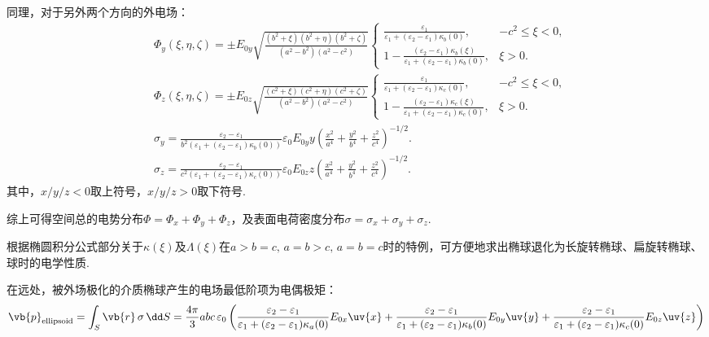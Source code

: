 同理，对于另外两个方向的外电场：
\begin{align*}
	&\Phi_y(\xi, \eta, \zeta) = \pm E_{0y} \sqrt{\frac{(b^2 + \xi)(b^2 + \eta)(b^2 + \zeta)}{(a^2 - b^2)(a^2 - c^2)}}\begin{cases}
		\displaystyle\frac{\varepsilon_1 }{\varepsilon_1 + (\varepsilon_2 - \varepsilon_1)\kappa_b(0)},                                    & -c^2 \leq \xi < 0, \\[8pt]
		\displaystyle 1 - \frac{(\varepsilon_2 - \varepsilon_1)\kappa_b(\xi)}{\varepsilon_1 + (\varepsilon_2 - \varepsilon_1)\kappa_b(0)}, & \xi > 0.
	\end{cases}\\
	&\Phi_z(\xi, \eta, \zeta) = \pm E_{0z} \sqrt{\frac{(c^2 + \xi)(c^2 + \eta)(c^2 + \zeta)}{(a^2 - b^2)(a^2 - c^2)}}\begin{cases}
		\displaystyle\frac{\varepsilon_1 }{\varepsilon_1 + (\varepsilon_2 - \varepsilon_1)\kappa_c(0)},                                    & -c^2 \leq \xi < 0, \\[8pt]
		\displaystyle 1 - \frac{(\varepsilon_2 - \varepsilon_1)\kappa_c(\xi)}{\varepsilon_1 + (\varepsilon_2 - \varepsilon_1)\kappa_c(0)}, & \xi > 0.
	\end{cases}\\
	&\sigma_y = \frac{\varepsilon_2 - \varepsilon_1}{ b^2  \left( \varepsilon_1 + (\varepsilon_2 - \varepsilon_1) \kappa_b(0) \right)} \varepsilon_0 E_{0y} y \left( \frac{x^2}{a^4} + \frac{y^2}{b^4} + \frac{z^2}{c^4} \right)^{-1/2}.\\
	&\sigma_z = \frac{\varepsilon_2 - \varepsilon_1}{c^2 \left( \varepsilon_1 + (\varepsilon_2 - \varepsilon_1) \kappa_c(0) \right)} \varepsilon_0 E_{0z} z \left( \frac{x^2}{a^4} + \frac{y^2}{b^4} + \frac{z^2}{c^4} \right)^{-1/2}.
\end{align*}
其中，\(x/y/z<0\)取上符号，\(x/y/z>0\)取下符号.

综上可得空间总的电势分布\(\Phi=\Phi_x+\Phi_y+\Phi_z\)，及表面电荷密度分布\(\sigma=\sigma_x+\sigma_y+\sigma_z\).

根据椭圆积分公式部分关于\(\kappa(\xi)\)及\(\Lambda(\xi)\)在\(a>b=c,\,a=b>c,\,a=b=c\)时的特例，可方便地求出椭球退化为长旋转椭球、扁旋转椭球、球时的电学性质.

在远处，被外场极化的介质椭球产生的电场最低阶项为电偶极矩：
\begin{align*}
	\vb{p}_{\text{ellipsoid}} = \int_S \vb{r}\,\sigma \, \dd S = \frac{4\pi}{3} a b c\,\varepsilon_0 \left(
	\frac{\varepsilon_2 - \varepsilon_1}{\varepsilon_1 + (\varepsilon_2 - \varepsilon_1) \kappa_a(0)}  E_{0x} \uv{x} +
	\frac{\varepsilon_2 - \varepsilon_1}{\varepsilon_1 + (\varepsilon_2 - \varepsilon_1) \kappa_b(0)} E_{0y} \uv{y} +
	\frac{\varepsilon_2 - \varepsilon_1}{\varepsilon_1 + (\varepsilon_2 - \varepsilon_1) \kappa_c(0)}  E_{0z} \uv{z}
	\right)
\end{align*}

